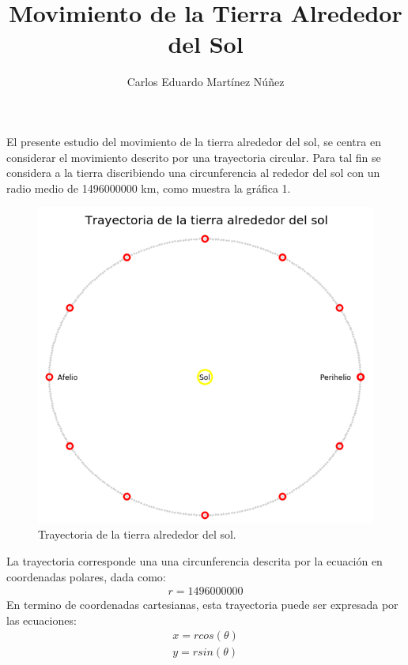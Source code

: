 \documentclass[12pt,a4paper,twoside]{article}
\author{Carlos Eduardo Martínez Núñez}
\title{\textbf{Movimiento de la Tierra Alrededor del Sol}}
\begin{document}
\maketitle
El presente estudio del movimiento de la tierra alrededor del sol, se centra en considerar el movimiento descrito por una trayectoria circular. Para tal fin se considera a la tierra discribiendo una circunferencia al rededor del sol con un radio medio de 1496000000 km, como muestra la gráfica 1. 
\begin{figure}[htbp]
\centering
\includegraphics[width=12cm]{trtierra.png}
\caption{Trayectoria de la tierra alrededor del sol.}\label{fig:figura1}
\end{figure}
La trayectoria corresponde una una circunferencia descrita por la ecuación en coordenadas polares, dada como:
\begin{eqnarray}
r=1496000000
\end{eqnarray}
En termino de coordenadas cartesianas, esta trayectoria puede ser expresada por las ecuaciones:
\begin{eqnarray}
x=rcos(\theta)\\
y=rsin(\theta)
\end{eqnarray}
\end{document}

